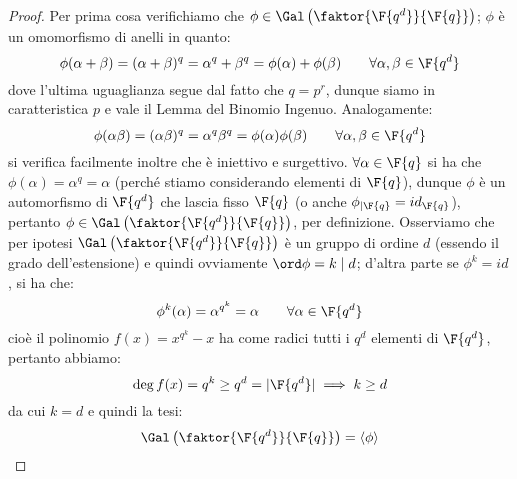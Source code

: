 \documentclass[11pt]{scrartcl}
\begin{document}
\begin{proof}
    Per prima cosa verifichiamo che $\phi \in \Gal\left(\faktor{\F{q^d}}{\F{q}}\right)$; $\phi$ è un omomorfismo di anelli in quanto:
    \[ \phi(\alpha+\beta) = (\alpha+\beta)^q = \alpha^q + \beta^q = \phi(\alpha) + \phi(\beta) \qquad \forall \alpha,\beta \in \F{q^d} 
        \]
    dove l'ultima uguaglianza segue dal fatto che $q = p^r$, dunque siamo in caratteristica $p$ e vale il Lemma del Binomio Ingenuo. Analogamente:
    \[ \phi(\alpha\beta) = (\alpha\beta)^q = \alpha^q \beta^q = \phi(\alpha)\phi(\beta) \qquad \forall \alpha,\beta \in \F{q^d} 
        \]
    si verifica facilmente inoltre che è iniettivo e surgettivo. $\forall \alpha \in \F{q}$ si ha che $\phi(\alpha) = \alpha^q = \alpha$ (perché stiamo considerando
    elementi di $\F{q}$), dunque $\phi$ è un automorfismo di $\F{q^d}$ che lascia fisso $\F{q}$ (o anche $\phi_{|\F{q}} = id_{\F{q}}$), pertanto
    $\phi \in \Gal\left(\faktor{\F{q^d}}{\F{q}}\right)$, per definizione. Osserviamo che per ipotesi $\Gal\left(\faktor{\F{q^d}}{\F{q}}\right)$ è un gruppo di ordine
    $d$ (essendo il grado dell'estensione) e quindi ovviamente $\ord \phi = k \mid d$; d'altra parte se $\phi^k = id$, si ha che:
    \[ \phi^k(\alpha) = \alpha^{q^k} = \alpha \qquad \forall \alpha \in \F{q^d}
        \]
    cioè il polinomio $f(x) = x^{q^k} - x$ ha come radici tutti i $q^d$ elementi di $\F{q^d}$, pertanto abbiamo:
    \[ \deg f(x) = q^k \geq q^d = |\F{q^d}|\implies k \geq d
        \]
    da cui $k = d$ e quindi la tesi:
    \[ \Gal\left(\faktor{\F{q^d}}{\F{q}}\right) = \left<\phi\right>
        \]
\end{proof}
\end{document}
